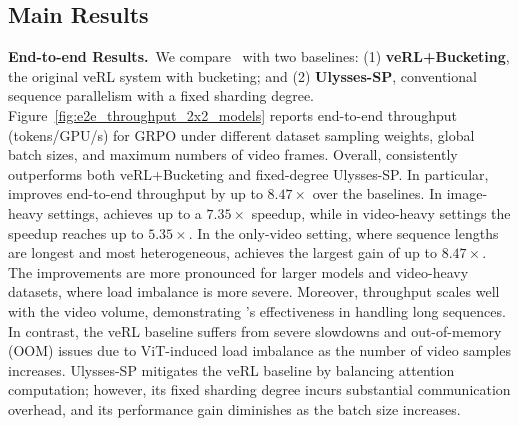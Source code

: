 \subsection{Main Results}

\noindent\textbf{End-to-end Results.}~We compare \SysName~with two baselines: (1) \textbf{veRL+Bucketing}, the original veRL system with bucketing; and (2) \textbf{Ulysses-SP}, conventional sequence parallelism with a fixed sharding degree. Figure~\ref{fig:e2e_throughput_2x2_models} reports end-to-end throughput (tokens/GPU/s) for GRPO under different dataset sampling weights, global batch sizes, and maximum numbers of video frames. Overall, \SysName consistently outperforms both veRL+Bucketing and fixed-degree Ulysses-SP. In particular, \SysName improves end-to-end throughput by up to $8.47\times$ over the baselines. In image-heavy settings, \SysName achieves up to a $7.35\times$ speedup, while in video-heavy settings the speedup reaches up to $5.35\times$. In the only-video setting, where sequence lengths are longest and most heterogeneous, \SysName achieves the largest gain of up to $8.47\times$. The improvements are more pronounced for larger models and video-heavy datasets, where load imbalance is more severe. Moreover, throughput scales well with the video volume, demonstrating \SysName's effectiveness in handling long sequences. In contrast, the veRL baseline suffers from severe slowdowns and out-of-memory (OOM) issues due to ViT-induced load imbalance as the number of video samples increases. Ulysses-SP mitigates the veRL baseline by balancing attention computation; however, its fixed sharding degree incurs substantial communication overhead, and its performance gain diminishes as the batch size increases.




